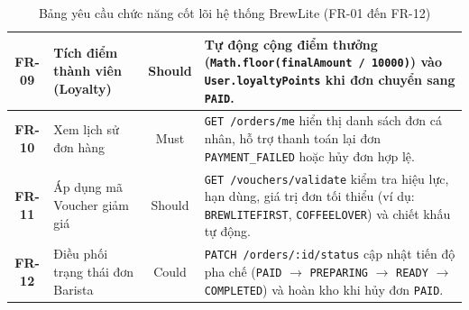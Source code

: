 \documentclass[a4paper,12pt]{article}
\begin{document}
\begin{table}[h!]
\begin{tabularx}{\textwidth}{|c|l|c|X|}
\textbf{FR-09} & Tích điểm thành viên (Loyalty) & Should & Tự động cộng điểm thưởng (\texttt{Math.floor(finalAmount / 10000)}) vào \texttt{User.loyaltyPoints} khi đơn chuyển sang \texttt{PAID}. \\
\hline
\textbf{FR-10} & Xem lịch sử đơn hàng & Must & \texttt{GET /orders/me} hiển thị danh sách đơn cá nhân, hỗ trợ thanh toán lại đơn \texttt{PAYMENT\_FAILED} hoặc hủy đơn hợp lệ. \\
\hline
\textbf{FR-11} & Áp dụng mã Voucher giảm giá & Should & \texttt{GET /vouchers/validate} kiểm tra hiệu lực, hạn dùng, giá trị đơn tối thiểu (ví dụ: \texttt{BREWLITEFIRST}, \texttt{COFFEELOVER}) và chiết khấu tự động. \\
\hline
\textbf{FR-12} & Điều phối trạng thái đơn Barista & Could & \texttt{PATCH /orders/:id/status} cập nhật tiến độ pha chế (\texttt{PAID} $\rightarrow$ \texttt{PREPARING} $\rightarrow$ \texttt{READY} $\rightarrow$ \texttt{COMPLETED}) và hoàn kho khi hủy đơn \texttt{PAID}. \\
\hline
\end{tabularx}
\caption{Bảng yêu cầu chức năng cốt lõi hệ thống BrewLite (FR-01 đến FR-12)}
\end{table}
\end{document}
